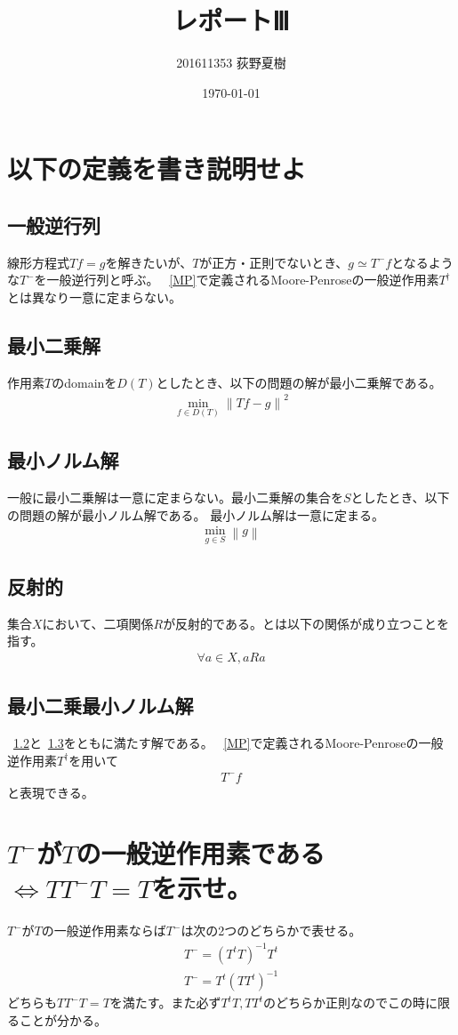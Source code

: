 \documentclass{ltjsarticle}
\title{レポートⅢ}
\author{201611353 荻野夏樹}
\date{\today}
\begin{document}
\section{以下の定義を書き説明せよ}
\subsection{一般逆行列}
線形方程式$Tf=g$を解きたいが、$T$が正方・正則でないとき、$g \simeq T^-f$となるような$T^-$を一般逆行列と呼ぶ。
~\ref{MP}で定義されるMoore-Penroseの一般逆作用素$T^\dagger$とは異なり一意に定まらない。

\subsection{最小二乗解}
\label{square}
作用素$T$のdomainを$D(T)$としたとき、以下の問題の解が最小二乗解である。
\begin{align}
   \min_{f\in D(T)}\left\| Tf-g \right\|^2
\end{align}

\subsection{最小ノルム解}
\label{norm}
一般に最小二乗解は一意に定まらない。最小二乗解の集合を$S$としたとき、以下の問題の解が最小ノルム解である。
最小ノルム解は一意に定まる。
\begin{align}
   \min_{g\in S}\left\| g \right\|
\end{align}

\subsection{反射的}
集合$X$において、二項関係$R$が反射的である。とは以下の関係が成り立つことを指す。
\begin{align}
    \forall a \in X, aRa
\end{align}
\subsection{最小二乗最小ノルム解}
~\ref{square}と~\ref{norm}をともに満たす解である。
~\ref{MP}で定義されるMoore-Penroseの一般逆作用素$T^\dagger$を用いて
\begin{align}
    T^-f
\end{align}
と表現できる。

\section{$T^-$が$T$の一般逆作用素である$\Leftrightarrow T T^- T=T$を示せ。}
$T^-$が$T$の一般逆作用素ならば$T^-$は次の2つのどちらかで表せる。
\begin{align}
    T^- = (T^t T)^{-1} T^t
\end{align}
\begin{align}
    T^- = T^t (TT^t )^{-1}
\end{align}
どちらも$T T^- T=T$を満たす。また必ず$T^tT,TT^t$のどちらか正則なのでこの時に限ることが分かる。
\end{document}
